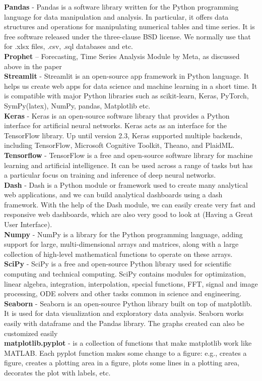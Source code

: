\textbf{Pandas} - Pandas is a software library written for the Python programming language for data manipulation and analysis. In particular, it offers data structures and operations for manipulating numerical tables and time series. It is free software released under the three-clause BSD license. We normally use that for .xlsx files, .csv, .sql databases and etc.\\
\textbf{Prophet} – Forecasting, Time Series Analysis Module by Meta, as discussed above in the paper\\
\textbf{Streamlit} - Streamlit is an open-source app framework in Python language. It helps us create web apps for data science and machine learning in a short time. It is compatible with major Python libraries such as scikit-learn, Keras, PyTorch, SymPy(latex), NumPy, pandas, Matplotlib etc.\\
\textbf{Keras} - Keras is an open-source software library that provides a Python interface for artificial neural networks. Keras acts as an interface for the TensorFlow library. Up until version 2.3, Keras supported multiple backends, including TensorFlow, Microsoft Cognitive Toolkit, Theano, and PlaidML.\\
\textbf{Tensorflow} - TensorFlow is a free and open-source software library for machine learning and artificial intelligence. It can be used across a range of tasks but has a particular focus on training and inference of deep neural networks.\\
\textbf{Dash} - Dash is a Python module or framework used to create many analytical web applications, and we can build analytical dashboards using a dash framework. With the help of the Dash module, we can easily create very fast and responsive web dashboards, which are also very good to look at (Having a Great User Interface).\\
\textbf{Numpy} - NumPy is a library for the Python programming language, adding support for large, multi-dimensional arrays and matrices, along with a large collection of high-level mathematical functions to operate on these arrays.\\
\textbf{SciPy} - SciPy is a free and open-source Python library used for scientific computing and technical computing. SciPy contains modules for optimization, linear algebra, integration, interpolation, special functions, FFT, signal and image processing, ODE solvers and other tasks common in science and engineering.\\
\textbf{Seaborn} - Seaborn is an open-source Python library built on top of matplotlib. It is used for data visualization and exploratory data analysis. Seaborn works easily with dataframe and
the Pandas library. The graphs created can also be customized easily\\
\textbf{matplotlib.pyplot} - is a collection of functions that make matplotlib work like MATLAB. Each pyplot function makes some change to a figure: e.g., creates a figure, creates a plotting area in a figure, plots some lines in a plotting area, decorates the plot with labels, etc.








